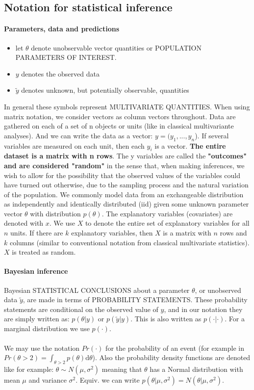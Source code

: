 \documentclass {article}
\begin{document}
\subsection{Notation for statistical inference}

\paragraph{Parameters, data and predictions}
\begin{itemize}
\item let $\theta$ denote unobservable vector quantities or POPULATION PARAMETERS OF INTEREST. 
\item $y$ denotes the observed data 
\item $\tilde{y}$ denotes unknown, but potentially observable, quantities 
\end{itemize}
In general these symbols represent MULTIVARIATE QUANTITIES. 
When using matrix notation, we consider vectors as column vectors throughout. 
Data are gathered on each of a set of n objects or units (like in classical multivariante analyses).
 And we can write the data as a vector: $y=(y_1, ..., y_n$).
 If several variables are measured on each unit, then each $y_i$ is a vector. 
\textbf{The entire dataset is a matrix with n rows}. The y variables are called the \textbf{"outcomes" and are considered "random"} in the sense that, when making inferences, we wish to allow for the possibility that the observed values of the variables could have turned out otherwise, due to the sampling process and the natural variation of the population.
We commonly model data from an exchangeable distribution as independently and identically distributed (iid) given some unknown parameter vector $\theta$ with distribution $p(\theta)$. 
The explanatory variables (covariates) are denoted with $x$.   
We use $X$ to denote the entire set of explanatory variables for all $n$ units. 
If there are $k$ explanatory variables, then $X$ is a matrix with $n$ rows and $k$ columns (similar to conventional notation from classical multivariate statistics).
$X$ is treated as random.

\paragraph{Bayesian inference}
Bayesian STATISTICAL CONCLUSIONS about a parameter $\theta$, or unobserved data $\tilde{y}$, are made in terms of PROBABILITY STATEMENTS.
These probability statements are conditional on the observed value of $y$, and in our notation they are simply written as: $p(\theta | y)$ or $p(\tilde{y} | y)$.
This is also written as $p(\cdot | \cdot)$. For a marginal distribution we use $p(\cdot)$. 
\\
\\
We may use the notation $Pr(\cdot)$ for the probability of an event (for example in $Pr(\theta > 2) = \int_{\theta >2} p(\theta) \mathrm{d}\theta$).
Also the probability density functions are denoted like for example: $\theta \sim N(\mu, \sigma^2)$ meaning that $\theta$ has a Normal distribution with mean $\mu$ and variance $\sigma^2$.
Equiv. we can write $p(\theta| \mu, \sigma^2)= N(\theta | \mu, \sigma^2)$.
\end{document}
